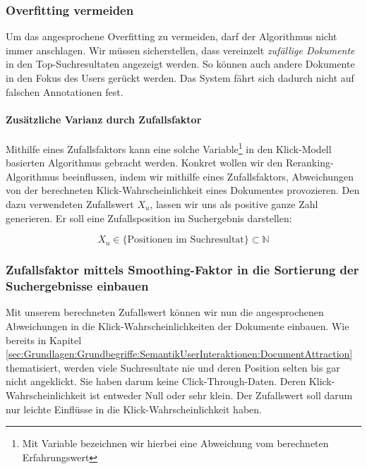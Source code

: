 \subsubsection{Overfitting vermeiden}
\label{sec:Reranking:Methodik:Vergessen:Overfitting}

Um das angesprochene Overfitting zu vermeiden, darf der Algorithmus nicht immer anschlagen. Wir müssen sicherstellen, dass vereinzelt \textit{zufällige Dokumente} in den \glqq Top-Suchresultaten\grqq{} angezeigt werden. So können auch andere Dokumente in den Fokus des Users gerückt werden. Das System fährt sich dadurch nicht auf falschen Annotationen fest. 

\paragraph{Zusätzliche Varianz durch Zufallsfaktor} 
Mithilfe eines Zufallsfaktors kann eine solche Variable\footnote{Mit Variable bezeichnen wir hierbei eine Abweichung vom berechneten Erfahrungswert} in den Klick-Modell basierten Algorithmus gebracht werden. Konkret wollen wir den Reranking-Algorithmus beeinflussen, indem wir mithilfe eines Zufallsfaktors, Abweichungen von der berechneten Klick-Wahrscheinlichkeit eines Dokumentes provozieren. Den dazu verwendeten Zufallswert $X_{u}$,  lassen wir uns als positive ganze Zahl generieren. Er soll eine Zufallsposition im Suchergebnis darstellen:

\vspace{-1.75em}
\begin{equation}	
	X_{u} \in \lbrace \text{Positionen im Suchresultat} \rbrace \subset \mathbb{N}
\end{equation}
\vspace{-1.5em}

\subsubsection{Zufallsfaktor mittels Smoothing-Faktor in 	die Sortierung der Suchergebnisse einbauen}
\label{sec:Reranking:Methodik:Vergessen:ZufallsfaktorSmoothing}

Mit unserem berechneten Zufallswert können wir nun die angesprochenen Abweichungen in die Klick-Wahrscheinlichkeiten der Dokumente einbauen. Wie bereits in Kapitel \ref{sec:Grundlagen:Grundbegriffe:SemantikUserInteraktionen:DocumentAttraction} thematisiert, werden viele Suchresultate nie und deren Position selten bis gar nicht angeklickt. Sie haben darum keine Click-Through-Daten. Deren Klick-Wahrscheinlichkeit ist entweder Null oder sehr klein. Der Zufallswert soll darum nur leichte Einflüsse in die Klick-Wahrscheinlichkeit haben.

